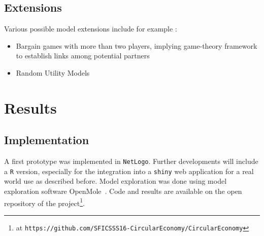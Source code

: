 \documentclass{article}
\begin{document}
{%
\subsection{Extensions}

Various possible model extensions include for example :
\begin{itemize}
\item Bargain games with more than two players, implying game-theory framework to establish links among potential partners
\item Random Utility Models
\end{itemize}















\section{Results}






\subsection{Implementation}

A first prototype was implemented in \texttt{NetLogo}. Further developments will include a \texttt{R} version, especially for the integration into a \texttt{shiny} web application for a real world use as described before. Model exploration was done using model exploration software OpenMole~\cite{reuillon2013openmole}. Code and results are available on the open repository of the project\footnote{at \texttt{https://github.com/SFICSSS16-CircularEconomy/CircularEconomy}}.


}
\end{document}
